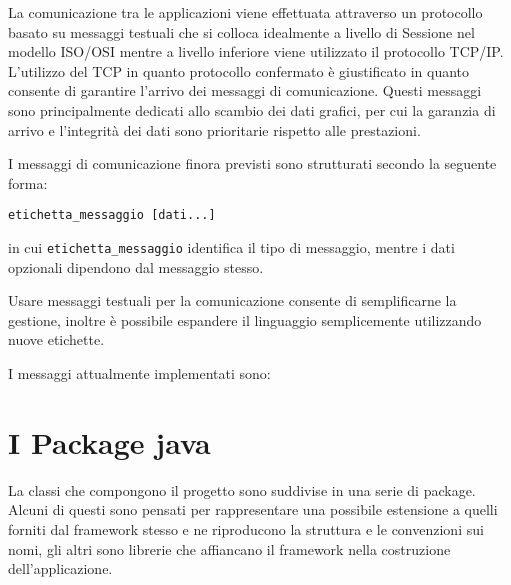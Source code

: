 La comunicazione tra le applicazioni viene effettuata attraverso un protocollo basato su messaggi testuali che si colloca idealmente a livello di Sessione nel modello ISO/OSI \cite{book:computernetworking} mentre a livello inferiore viene utilizzato il protocollo TCP/IP.
L'utilizzo del TCP in quanto protocollo confermato è giustificato in quanto consente di garantire l'arrivo dei messaggi di comunicazione. Questi messaggi sono principalmente dedicati allo scambio dei dati grafici, per cui la garanzia di arrivo e l'integrità dei dati sono prioritarie rispetto alle prestazioni.


I messaggi di comunicazione finora previsti sono strutturati secondo la seguente forma:
\begin{verbatim}
etichetta_messaggio [dati...]
\end{verbatim}

in cui \texttt{etichetta\_messaggio} identifica il tipo di messaggio, mentre i dati opzionali dipendono dal messaggio stesso.



Usare messaggi testuali per la comunicazione consente di semplificarne la gestione, inoltre è possibile espandere il linguaggio semplicemente utilizzando nuove etichette.

I messaggi attualmente implementati sono:





\section{I Package java} 
\label{sec:sfrc_packages}
La classi che compongono il progetto sono suddivise in una serie di package. %
Alcuni di questi sono pensati per rappresentare una possibile estensione a quelli forniti dal framework stesso e ne riproducono la struttura e le convenzioni sui nomi, gli altri sono librerie che affiancano il framework nella costruzione dell'applicazione.
